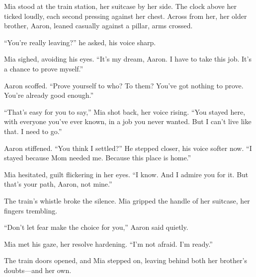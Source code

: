 \documentclass[12pt]{article}
\begin{document}
\begin{tcolorbox}[colframe=black!60, colback=white, 
coltitle=black, colbacktitle=black!15, fonttitle=\bfseries\Large, 
title=Text: The Last Train, halign title=center, left=10pt, right=10pt, top=10pt, bottom=15pt]

Mia stood at the train station, her suitcase by her side. The clock above her ticked loudly, each second pressing against her chest. Across from her, her older brother, Aaron, leaned casually against a pillar, arms crossed.

“You’re really leaving?” he asked, his voice sharp.

Mia sighed, avoiding his eyes. “It’s my dream, Aaron. I have to take this job. It’s a chance to prove myself.”

Aaron scoffed. “Prove yourself to who? To them? You’ve got nothing to prove. You’re already good enough.”

“That’s easy for you to say,” Mia shot back, her voice rising. “You stayed here, with everyone you’ve ever known, in a job you never wanted. But I can’t live like that. I need to go.”

Aaron stiffened. “You think I settled?” He stepped closer, his voice softer now. “I stayed because Mom needed me. Because this place is home.”

Mia hesitated, guilt flickering in her eyes. “I know. And I admire you for it. But that’s your path, Aaron, not mine.”

The train’s whistle broke the silence. Mia gripped the handle of her suitcase, her fingers trembling.

“Don’t let fear make the choice for you,” Aaron said quietly.

Mia met his gaze, her resolve hardening. “I’m not afraid. I’m ready.”

The train doors opened, and Mia stepped on, leaving behind both her brother’s doubts—and her own.






\end{tcolorbox}

\vspace{1em}
\end{document}
